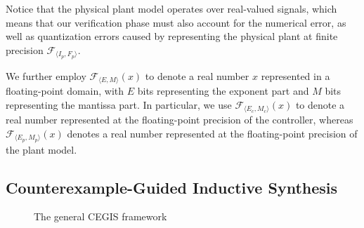 Notice that the physical plant model operates over real-valued signals, 
which means that our verification phase  must also account for the numerical error, 
as well as quantization errors caused by representing the physical plant at finite precision $\mathcal{F}_{\langle I_p,F_p \rangle}$. 
 
We further employ $\mathcal{F}_{\langle E,M \rangle}(x)$ to denote a real number $x$ represented in a floating-point domain, 
with $E$ bits representing the exponent part and $M$ bits representing the mantissa part. 
In particular, 
we use $\mathcal{F}_{\langle E_c,M_c \rangle}(x)$ to denote a real number 
represented at the floating-point precision of the controller, 
whereas $\mathcal{F}_{\langle E_p,M_p \rangle}(x)$ denotes a real number represented at the floating-point precision of the plant model.  

\subsection{Counterexample-Guided Inductive Synthesis} 
\label{ssec:cegis}

\begin{figure}
\centering
{}
 \caption{The general CEGIS framework\label{fig:CEGIS}}
\end{figure}

